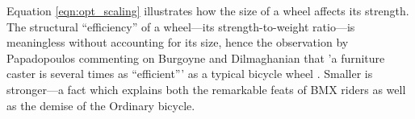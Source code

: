 \documentclass[\rootdir/thesis.tex]{subfiles}
\begin{document}
Equation \eqref{eqn:opt_scaling} illustrates how the size of a wheel affects its strength. The structural ``efficiency'' of a wheel---its strength-to-weight ratio---is meaningless without accounting for its size, hence the observation by Papadopoulos commenting on Burgoyne and Dilmaghanian \cite{Burgoyne1993} that 'a furniture caster is several times as ``efficient''' as a typical bicycle wheel \cite{Papadopoulos1995}. Smaller is stronger---a fact which explains both the remarkable feats of BMX riders as well as the demise of the Ordinary bicycle.
\end{document}
